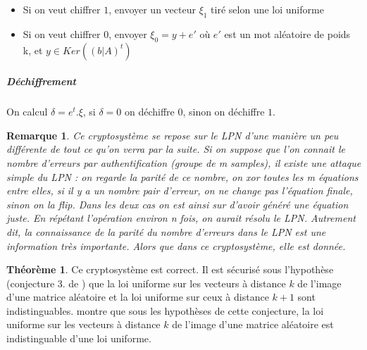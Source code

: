 \documentclass{article}		%
\theoremstyle{definition}
\newtheorem{theo}{Théorème}
\theoremstyle{plain}
\theoremstyle{plain}
\theoremstyle{plain}
\theoremstyle{plain}
\newtheorem{remark}{Remarque}
\theoremstyle{plain}
\begin{document}
\begin{itemize}
\item Si on veut chiffrer $1$, envoyer un vecteur $\xi_1$ tiré selon une loi
uniforme
\item Si on veut chiffrer $0$, envoyer $\xi_0=y+e'$ où $e'$ est un mot aléatoire
de poids k, et $y\in Ker((b|A)^t)$
\end{itemize}

\subparagraph{Déchiffrement}
On calcul $\delta= e^t.\xi$, si $\delta=0$ on déchiffre $0$, sinon on
déchiffre $1$.


\begin{remark}
Ce cryptosystème se repose sur le LPN d'une manière un peu différente de
tout ce qu'on verra par la suite. Si on suppose que l'on connait le
nombre d'erreurs par authentification (groupe de m samples), il existe une attaque simple du
LPN : on regarde la parité de ce nombre, on xor toutes les m équations
entre elles, si il y a un nombre pair d'erreur, on ne change pas
l'équation finale, sinon on la flip. Dans les deux cas on est ainsi sur
d'avoir généré une équation juste. En répétant l'opération environ n
fois, on aurait résolu le LPN. Autrement dit, la connaissance de la
parité du nombre d'erreurs dans le LPN est une information très
importante. Alors que dans ce cryptosystème, elle est donnée.
\end{remark}

\begin{theo}
Ce cryptosystème est correct. Il est sécurisé sous l'hypothèse (conjecture 3.
de \cite{Alekh}) que la loi uniforme sur
les vecteurs à distance $k$ de l'image d'une matrice aléatoire et la loi
uniforme sur ceux à distance $k+1$ sont
indistinguables. \cite{Alekh} montre que sous les hypothèses de cette
conjecture, la loi uniforme sur les vecteurs à distance $k$ de l'image
d'une matrice aléatoire est indistinguable d'une loi uniforme.


\end{theo}
\end{document}

